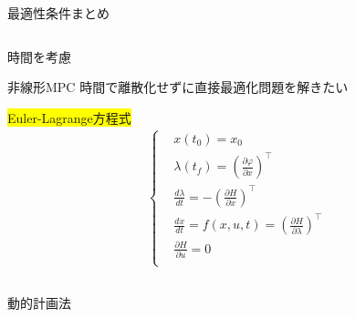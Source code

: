 \documentclass[twocolumn, dvipdfmx,12pt]{beamer}
\begin{document}
\begin{frame}{最適性条件まとめ}
\begin{columns}
            \begin{column}{.55\textwidth}
                \begin{itembox}[l]{時間を考慮}
                    \begin{itembox}[l]{非線形MPC}
                        時間で離散化せずに直接最適化問題を解きたい
                    \end{itembox}
                    \colorbox{yellow}{Euler-Lagrange方程式}\\
                    \begin{align*}
                        \begin{cases}
                            &x(t_0)=x_0 \\
                            &\lambda(t_f)=\left(\frac{\partial \varphi}{\partial x}\right)^\top \\
                            &\frac{d\lambda}{dt}=-\left(\frac{\partial H}{\partial x}\right)^\top\\
                            &\frac{dx}{dt}=f(x,u,t)=\left(\frac{\partial H}{\partial \lambda}\right)^\top \\
                            &\frac{\partial H}{\partial u}=0 \\
                        \end{cases}
                    \end{align*}
                    \begin{columns}
                        \begin{column}{.5\textwidth}
                            \begin{center}
                                \begin{itembox}[l]{動的計画法}
                                \end{itembox}
                            \end{center}
                        \end{column}
                        \begin{column}{.5\textwidth}
                        \end{column}
                    \end{columns}
                    
                \end{itembox}
            \end{column}
        \end{columns}
    \end{frame}
\end{document}
